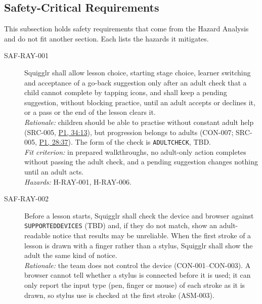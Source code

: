 \documentclass[12pt]{article}
\renewcommand{\_}{\textunderscore\allowbreak}%
\newcommand{\intlink}[3]{\hyperref[int:#1-#2]{#3}}
\newcommand{\intref}[2]{\intlink{#1}{#2}{#1, #2}}
\begin{document}
\subsection{Safety-Critical Requirements}
This subsection holds safety requirements that come from the Hazard Analysis and
do not fit another section. Each lists the hazards it mitigates.


\begin{description}
\item[SAF-RAY-001]\label{req:SAF-RAY-001} Squigglr shall allow
lesson choice, starting stage choice, learner switching and acceptance of a
go-back suggestion only after an adult check that a child cannot complete by
tapping icons, and shall keep a pending suggestion, without blocking practice,
until an adult accepts or declines it, or a pass or the end of the lesson
clears it.\\
\emph{Rationale:} children should be able to practise without constant adult
help (SRC-005, \intref{P1}{34:13}), but progression belongs to adults (CON-007;
SRC-005, \intref{P1}{28:37}). The form of the check is \texttt{ADULT\_CHECK},
TBD.\\
\emph{Fit criterion:} in prepared walkthroughs, no adult-only action completes
without passing the adult check, and a pending suggestion changes nothing until
an adult acts.\\
\emph{Hazards:} H-RAY-001, H-RAY-006.
\item[SAF-RAY-002]\label{req:SAF-RAY-002} Before a lesson starts,
Squigglr shall check the device and browser against \texttt{SUPPORTED\_DEVICES}
(TBD) and, if they do not match, show an adult-readable notice that results may
be unreliable. When the first stroke of a lesson is drawn with a finger rather
than a stylus, Squigglr shall show the adult the same kind of notice.\\
\emph{Rationale:} the team does not control the device (CON-001--CON-003). A
browser cannot tell whether a stylus is connected before it is used; it can
only report the input type (pen, finger or mouse) of each stroke as it is
drawn, so stylus use is checked at the first stroke (ASM-003).\\

\end{description}
\end{document}
